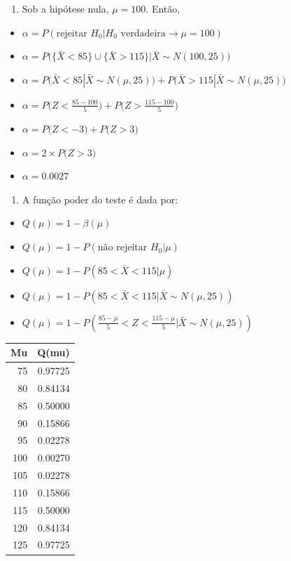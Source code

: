 \documentclass[
]{book}
\providecommand{\tightlist}{%
  \setlength{\itemsep}{0pt}\setlength{\parskip}{0pt}}
\begin{document}
\begin{enumerate}
\def\labelenumi{\arabic{enumi}.}
\tightlist
\item
  Sob a hipótese nula, \(\mu=100\). Então,
\end{enumerate}

\begin{itemize}
\tightlist
\item
  \(\alpha = P(\text{rejeitar } H_0 | H_0 \text{ verdadeira}\rightarrow \mu=100)\)
\item
  \(\alpha = P\Big(\{\bar X<85\} \cup \{\bar X>115\}|\bar X\sim N(100,25)\Big)\)
\item
  \(\alpha = P\Big(\bar X<85 |\bar X\sim N(\mu,25)\Big) + P\Big(\bar X>115 |\bar X\sim N(\mu,25)\Big)\)
\item
  \(\alpha = P\Big(Z<\frac{85-100}{5}\Big) + P\Big(Z>\frac{115-100}{5}\Big)\)
\item
  \(\alpha = P\Big(Z<-3\Big) + P\Big(Z>3\Big)\)
\item
  \(\alpha = 2\times P\Big(Z>3\Big)\)
\item
  \(\alpha = 0.0027\)
\end{itemize}

\begin{enumerate}
\def\labelenumi{\arabic{enumi}.}
\setcounter{enumi}{1}
\tightlist
\item
  A função poder do teste é dada por:
\end{enumerate}

\begin{itemize}
\tightlist
\item
  \(Q(\mu) = 1-\beta(\mu)\)
\item
  \(Q(\mu)=1-P(\text{não rejeitar } H_0|\mu)\)
\item
  \(Q(\mu)=1-P(85<\bar X<115|\mu)\)
\item
  \(Q(\mu)=1-P(85<\bar X<115|\bar X\sim N(\mu,25))\)
\item
  \(Q(\mu)=1-P(\frac{85-\mu}{5}< Z<\frac{115-\mu}{5}|\bar X\sim N(\mu,25))\)
\end{itemize}

\begin{tabular}{r|r}
\hline
Mu & Q(mu)\\
\hline
75 & 0.97725\\
\hline
80 & 0.84134\\
\hline
85 & 0.50000\\
\hline
90 & 0.15866\\
\hline
95 & 0.02278\\
\hline
100 & 0.00270\\
\hline
105 & 0.02278\\
\hline
110 & 0.15866\\
\hline
115 & 0.50000\\
\hline
120 & 0.84134\\
\hline
125 & 0.97725\\
\hline
\end{tabular}
\end{document}
